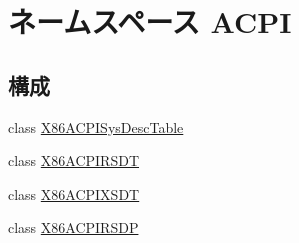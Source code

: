 \hypertarget{namespaceACPI}{
\section{ネームスペース ACPI}
\label{namespaceACPI}
}
\subsection*{構成}
\begin{DoxyCompactItemize}
\item 
class \hyperlink{classACPI_1_1X86ACPISysDescTable}{X86ACPISysDescTable}
\item 
class \hyperlink{classACPI_1_1X86ACPIRSDT}{X86ACPIRSDT}
\item 
class \hyperlink{classACPI_1_1X86ACPIXSDT}{X86ACPIXSDT}
\item 
class \hyperlink{classACPI_1_1X86ACPIRSDP}{X86ACPIRSDP}
\end{DoxyCompactItemize}

